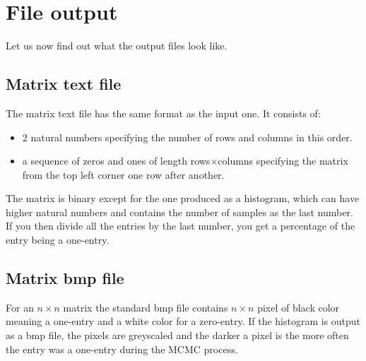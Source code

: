 \section{File output}
Let us now find out what the output files look like.

\subsection{Matrix text file}
The matrix text file has the same format as the input one. It consists of:
\begin{itemize}
\item 2 natural numbers specifying the number of rows and columns in this order.
\item a sequence of zeros and ones of length rows$\times$columns specifying the matrix from the top left corner one row after another.
\end{itemize}
The matrix is binary except for the one produced as a histogram, which can have higher natural numbers and contains the number of samples as the last number. If you then divide all the entries by the last number, you get a percentage of the entry being a one-entry.

\subsection{Matrix bmp file}
For an $n\times n$ matrix the standard bmp file contains $n\times n$ pixel of black color meaning a one-entry and a white color for a zero-entry. If the histogram is output as a bmp file, the pixels are greyscaled and the darker a pixel is the more often the entry was a one-entry during the MCMC process.
